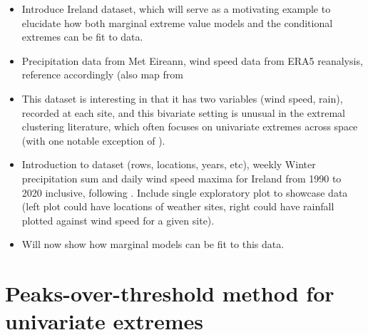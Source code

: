 \documentclass{article}
\numberwithin{equation}{section}
\begin{document}
\begin{itemize}
  \item Introduce Ireland dataset, which will serve as a motivating example to elucidate how both marginal extreme value models and the conditional extremes can be fit to data. 
  \item Precipitation data from Met Eireann, wind speed data from ERA5 reanalysis, reference accordingly (also map from 
  \item This dataset is interesting in that it has two variables (wind speed, rain), recorded at each site, and this bivariate setting is unusual in the extremal clustering literature, which often focuses on univariate extremes across space (with one notable exception of \cite{Vignotto2021}). 
  \item Introduction to dataset (rows, locations, years, etc), weekly Winter precipitation sum and daily wind speed maxima for Ireland from 1990 to 2020 inclusive, following \cite{Vignotto2021}. 
    Include single exploratory plot to showcase data (left plot could have locations of weather sites, right could have rainfall plotted against wind speed for a given site).
    \item Will now show how marginal models can be fit to this data.
\end{itemize}

\section{Peaks-over-threshold method for univariate extremes}\label{sec:uni}
\end{document}
